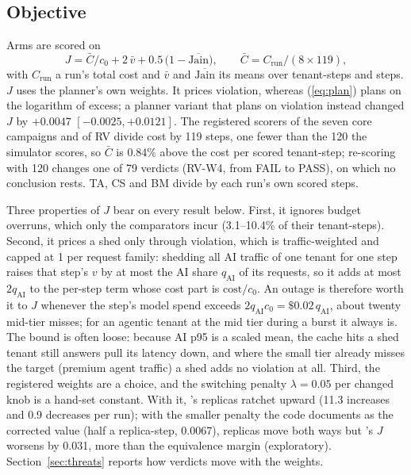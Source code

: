 \subsection{Objective}
\label{sec:objective}

Arms are scored on
\begin{equation}
\label{eq:J}
J=\bar C/c_0+2\,\bar v+0.5\,\bigl(1-\overline{\mathrm{Jain}}\bigr),\qquad
\bar C=C_{\mathrm{run}}/(8\times119),
\end{equation}
with $C_{\mathrm{run}}$ a run's total cost and $\bar v$ and
$\overline{\mathrm{Jain}}$ its means over tenant-steps and steps. $J$ uses
the planner's own weights. It prices violation, whereas (\ref{eq:plan})
plans on the logarithm of excess; a planner variant that plans on
violation instead changed $J$ by $+0.0047$ $[-0.0025,+0.0121]$. The
registered scorers of the seven core campaigns and of RV divide cost by 119
steps, one fewer than the 120 the simulator scores, so $\bar C$ is 0.84\%
above the cost per scored tenant-step; re-scoring with 120 changes one of
79 verdicts (RV-W4, from FAIL to PASS), on which no conclusion rests. TA, CS
and BM divide by each run's own scored steps.

Three properties of $J$ bear on every result below. First, it ignores
budget overruns, which only the comparators incur (3.1--10.4\% of their
tenant-steps). Second, it prices a shed only through violation, which is
traffic-weighted and capped at 1 per request family: shedding all AI
traffic of one tenant for one step raises that step's $v$ by at most the
AI share $q_{\mathrm{AI}}$ of its requests, so it adds at most
$2q_{\mathrm{AI}}$ to the per-step term whose cost part is
$\mathrm{cost}/c_0$. An outage is therefore worth it to $J$ whenever the
step's model spend exceeds $2q_{\mathrm{AI}}c_0=\$0.02\,q_{\mathrm{AI}}$,
about twenty mid-tier misses; for an agentic tenant at the mid tier during
a burst it always is. The bound is often loose: because AI p95 is a scaled
mean, the cache hits a shed tenant still answers pull its latency down, and
where the small tier already misses the target (premium agent traffic) a
shed adds no violation at all. Third, the registered weights are a choice,
and the switching penalty $\lambda=0.05$ per changed knob is a hand-set
constant. With it, \jcac{}'s replicas ratchet upward (11.3 increases and 0.9
decreases per run); with the smaller penalty the code documents as the
corrected value (half a replica-step, 0.0067), replicas move both ways but
\jcac{}'s $J$ worsens by 0.031, more than the equivalence margin
(exploratory). Section~\ref{sec:threats} reports how verdicts move with the
weights.


